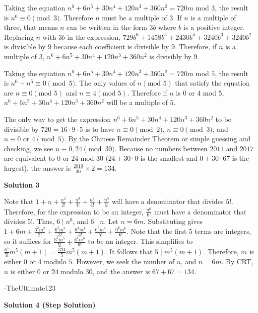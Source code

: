 \begin{enumerate}
 Taking the equation $n^6+6n^5+30n^4+120n^3+360n^2=720m$ mod $3$, the result is $n^6 \equiv 0 \pmod{3}$. Therefore $n$ must be a multiple of $3$. If $n$ is a multiple of three, that means $n$ can be written in the form $3b$ where $b$ is a positive integer. Replacing $n$ with $3b$ in the expression, $729b^6+1458b^5+2430b^4+3240b^3+3240b^2$ is divisible by $9$ because each coefficient is divisible by $9$. Therefore, if $n$ is a multiple of $3$, $n^6+6n^5+30n^4+120n^3+360n^2$ is divisibly by $9$.

 Taking the equation $n^6+6n^5+30n^4+120n^3+360n^2=720m$ mod $5$, the result is $n^6+n^5 \equiv 0 \pmod{5}$. The only values of $n (\text{mod }5)$ that satisfy the equation are $n\equiv0(\text{mod }5)$ and $n\equiv4(\text{mod }5)$. Therefore if $n$ is $0$ or $4$ mod $5$, $n^6+6n^5+30n^4+120n^3+360n^2$ will be a multiple of $5$.

 The only way to get the expression $n^6+6n^5+30n^4+120n^3+360n^2$ to be divisible by $720=16 \cdot 9 \cdot 5$ is to have $n \equiv 0 \pmod{2}$, $n \equiv 0 \pmod{3}$, and $n \equiv 0 \text{ or } 4 \pmod{5}$. By the Chinese Remainder Theorem or simple guessing and checking, we see $n\equiv0,24 \pmod{30}$. Because no numbers between $2011$ and $2017$ are equivalent to $0$ or $24$ mod $30$ ($24+30\cdot0$ is the smallest and $0+30\cdot67$ is the largest), the answer is $\frac{2010}{30}\times2=\boxed{134}$.

 



\textbf{Solution 3}

Note that $1+n+\frac{n^2}{2!}+\frac{n^3}{3!}+\frac{n^4}{4!}+\frac{n^5}{5!}$ will have a denominator that divides $5!$. Therefore, for the expression to be an integer, $\frac{n^6}{6!}$ must have a denominator that divides $5!$. Thus, $6\mid n^6$, and $6\mid n$. Let $n=6m$. Substituting gives $1+6m+\frac{6^2m^2}{2!}+\frac{6^3m^3}{3!}+\frac{6^4m^4}{4!}+\frac{6^5m^5}{5!}+\frac{6^6m^6}{6!}$. Note that the first $5$ terms are integers, so it suffices for $\frac{6^5m^5}{5!}+\frac{6^6m^6}{6!}$ to be an integer. This simplifies to $\frac{6^5}{5!}m^5(m+1)=\frac{324}{5}m^5(m+1)$. It follows that $5\mid m^5(m+1)$. Therefore, $m$ is either $0$ or $4$ modulo $5$. However, we seek the number of $n$, and $n=6m$. By CRT, $n$ is either $0$ or $24$ modulo $30$, and the answer is $67+67=\boxed{134}$.

 -TheUltimate123

 



\textbf{Solution 4 (Step Solution)}


\end{enumerate}
